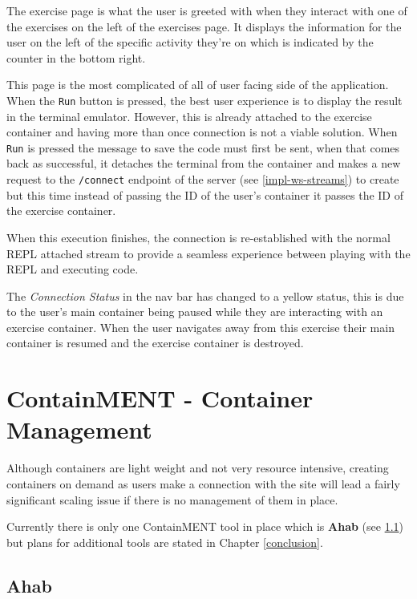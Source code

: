 The exercise page is what the user is greeted with when they interact with one of the exercises on the left of the exercises page. It displays the information for the user on the left of the specific activity they're on which is indicated by the counter in the bottom right. 

This page is the most complicated of all of user facing side of the application. When the \texttt{Run} button is pressed, the best user experience is to display the result in the terminal emulator. However, this is already attached to the exercise container and having more than once connection is not a viable solution. When \texttt{Run} is pressed the message to save the code must first be sent, when that comes back as successful, it detaches the terminal from the container and makes a new request to the \texttt{/connect} endpoint of the server (see \ref{impl-ws-streams}) to create but this time instead of passing the ID of the user's container it passes the ID of the exercise container.

When this execution finishes, the connection is re-established with the normal REPL attached stream to provide a seamless experience between playing with the REPL and executing code.

The \textit{Connection Status} in the nav bar has changed to a yellow status, this is due to the user's main container being paused while they are interacting with an exercise container. When the user navigates away from this exercise their main container is resumed and the exercise container is destroyed. 

\section{ContainMENT - Container Management} \label{impl-containment}

Although containers are light weight and not very resource intensive, creating containers on demand as users make a connection with the site will lead a fairly significant scaling issue if there is no management of them in place.

Currently there is only one ContainMENT tool in place which is \textbf{Ahab} (see \ref{impl-ahab}) but plans for additional tools are stated in Chapter \ref{conclusion}.

\subsection{Ahab} \label{impl-ahab}

